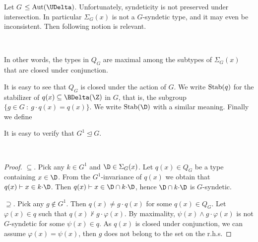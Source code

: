 Let \emph{$G$\/} $\le{\rm Aut}(\UDelta)$.
Unfortunately, syndeticity is not preserved under intersection.
In particular $\Sigma_G(x)$ is not a $G$-syndetic type, and it may even be inconsistent.
Then following notion is relevant.

\begin{definition}\label{def_Q}\ 

  \smallskip

  In other words, the types in $Q_G$ are maximal among the subtypes of $\Sigma_G(x)$ that are closed under conjunction.
\end{definition}

It is easy to see that $Q_G$ is closed under the action of $G$.
We write ${\rm Stab}(q)$ for the stabilizer of $q(x)\subseteq\BDelta(\Z)$ in $G$, that is, the subgroup $\{g\in G\ :\ g{\cdot}q(x)=q(x)\}$.
We write ${\rm Stab}(\D)$ with a similar meaning.
Finally we define


It is easy to verify that $G^1\trianglelefteq G$.

\begin{proposition}\label{prop_StabQ}\ \smallskip

  \smallskip
\end{proposition}

\begin{proof}
  $\subseteq$.
  Pick any $k\in G^1$ and $\D\in\Sigma_G(x)$.
  Let $q(x)\in Q_G$ be a type containing $x\in\D$.
  From the $G^1$-invariance of $q(x)$ we obtain that $q(x)\vdash x\in k{\cdot}\D$.
  Then $q(x)\vdash x\in \D\cap k{\cdot}\D$, hence $\D\cap k{\cdot}\D$ is $G$-syndetic.

  $\supseteq$.
  Pick any $g\notin G^1$.
  Then $q(x)\neq g{\cdot}q(x)$ for some $q(x)\in Q_G$.
  Let $\varphi(x)\in q$ such that $q(x)\not\vdash g{\cdot}\varphi(x)$.
  By maximality, $\psi(x)\wedge g{\cdot}\varphi(x)$ is not $G$-syndetic for some $\psi(x)\in q$.
  As $q(x)$ is closed under conjunction, we can assume $\varphi(x)=\psi(x)$, then $g$ does not belong to the set on the r.h.s.
\end{proof}


\begin{definition}\label{def_P}\ 

  \smallskip

  
\end{definition}

